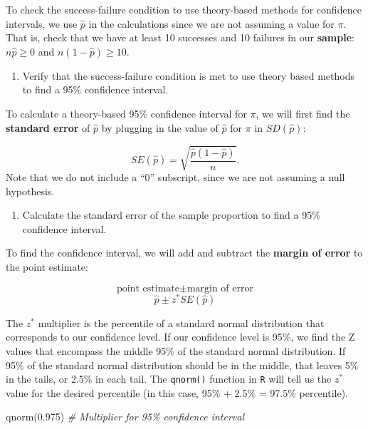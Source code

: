 \documentclass[
]{report}
\newenvironment{Shaded}{\begin{snugshade}}{\end{snugshade}}
\newcommand{\CommentTok}[1]{\textcolor[rgb]{0.56,0.35,0.01}{\textit{#1}}}
\newcommand{\FloatTok}[1]{\textcolor[rgb]{0.00,0.00,0.81}{#1}}
\newcommand{\FunctionTok}[1]{\textcolor[rgb]{0.00,0.00,0.00}{#1}}
\newcommand{\NormalTok}[1]{#1}
\providecommand{\tightlist}{%
  \setlength{\itemsep}{0pt}\setlength{\parskip}{0pt}}
\begin{document}
To check the success-failure condition to use theory-based methods for confidence intervals, we use \(\hat{p}\) in the calculations since we are not assuming a value for \(\pi\). That is, check that we have at least 10 successes and 10 failures in our \textbf{sample}: \(n\hat{p} \geq 0\) and \(n(1-\hat{p}) \geq 10\).

\begin{enumerate}
\def\labelenumi{\arabic{enumi}.}
\tightlist
\item
  Verify that the success-failure condition is met to use theory based methods to find a 95\% confidence interval.
\end{enumerate}

\vspace{0.5in}

To calculate a theory-based 95\% confidence interval for \(\pi\), we will first find the \textbf{standard error} of \(\hat{p}\) by plugging in the value of \(\hat{p}\) for \(\pi\) in \(SD(\hat{p})\):

\[SE(\hat{p}) = \sqrt{\frac{\hat{p}(1-\hat{p})}{n}}.\]
Note that we do not include a ``0'' subscript, since we are not assuming a null hypothesis.

\begin{enumerate}
\def\labelenumi{\arabic{enumi}.}
\setcounter{enumi}{1}
\tightlist
\item
  Calculate the standard error of the sample proportion to find a 95\% confidence interval.
\end{enumerate}

\vspace{0.5in}

To find the confidence interval, we will add and subtract the \textbf{margin of error} to the point estimate:

\[\text{point estimate}\pm\text{margin of error}\]
\[\hat{p}\pm z^* SE(\hat{p})\]

The \(z^*\) multiplier is the percentile of a standard normal distribution that corresponds to our confidence level. If our confidence level is 95\%, we find the Z values that encompass the middle 95\% of the standard normal distribution. If 95\% of the standard normal distribution should be in the middle, that leaves 5\% in the tails, or 2.5\% in each tail. The \texttt{qnorm()} function in \texttt{R} will tell us the \(z^*\) value for the desired percentile (in this case, 95\% + 2.5\% = 97.5\% percentile).

\begin{Shaded}
\begin{Highlighting}[]
\FunctionTok{qnorm}\NormalTok{(}\FloatTok{0.975}\NormalTok{) }\CommentTok{\# Multiplier for 95\% confidence interval}
\end{Highlighting}
\end{Shaded}
\end{document}
